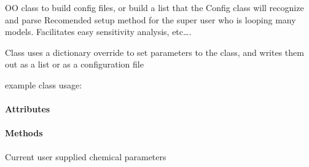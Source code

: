 \documentclass[letterpaper,10pt,english]{sphinxmanual}
\begin{document}
\begin{fulllineitems}
\label{\detokenize{index:lb_colloids.Colloids.Colloid_IO.ColloidsConfig}}
OO class to build config files, or build a list that the Config class will recognize and parse
Recomended setup method for the super user who is looping many models.
Facilitates easy sensitivity analysis, etc….

Class uses a dictionary override to set parameters to the class, and writes them out as a list
or as a configuration file

example class usage:

\begin{sphinxVerbatim}[commandchars=\\\{\}]
   
  
\PYG{p}{[}\PYG{p}{]}  
\PYG{p}{[}\PYG{p}{]}  
    
  
\end{sphinxVerbatim}
\paragraph{Attributes}
\paragraph{Methods}

\begin{fulllineitems}
\label{\detokenize{index:lb_colloids.Colloids.Colloid_IO.ColloidsConfig.chemical_parameters}}
Current user supplied chemical parameters


\end{fulllineitems}
\end{fulllineitems}
\end{document}
